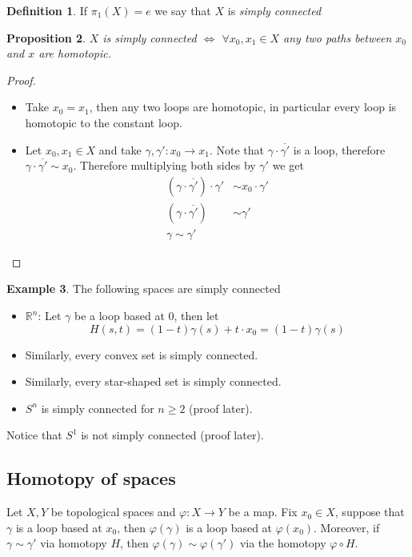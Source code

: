 \documentclass[11pt,a4paper]{article}
\theoremstyle{definition}
\newtheorem{definition}{Definition}[section]
\newtheorem{example}[definition]{Example}
\theoremstyle{plain}
\newtheorem{proposition}[definition]{Proposition}
\theoremstyle{remark}
\newcommand{\R}{\mathbb{R}}
\newcommand{\1}{\mathbbm{1}}
\begin{document}
\begin{definition}
    If $\pi_1(X) = e$ we say that $X$ is \emph{simply connected}
\end{definition}

\begin{proposition}
    $X$ is simply connected $\iff$ $\forall x_0, x_1 \in X$ any two paths between $x_0$ and $x$ are homotopic.
\end{proposition}

\begin{proof}
    \begin{itemize}
        \item[$\impliedby$] Take $x_0 = x_1$, then any two loops are homotopic, in particular every loop is homotopic to the constant loop.
        \item[$\implies$] Let $x_0, x_1 \in X$ and take $\gamma, \gamma' \colon x_0 \to x_1$. Note that $\gamma \cdot \overline{\gamma'}$ is a loop, 
        therefore $\gamma \cdot \overline{\gamma'} \sim x_0$. Therefore multiplying both sides by $\gamma'$ we get 
        \begin{align*}
            (\gamma \cdot \overline{\gamma'}) \cdot \gamma' &\sim x_0 \cdot \gamma' \\
            (\gamma \cdot \overline{\gamma'}) &\sim \gamma'\\
            \gamma \sim \gamma'
        \end{align*}
    \end{itemize}
\end{proof}

\begin{example}
    The following spaces are simply connected 
    \begin{itemize}
        \item $\R^n$: Let $\gamma$ be a loop based at $0$, then let 
        $$H(s, t) = (1-t) \gamma(s) + t \cdot x_0 = (1-t) \gamma(s)$$
        \item Similarly, every convex set is simply connected. 
        \item Similarly, every star-shaped set is simply connected. 
        \item $S^n$ is simply connected for $n \geq 2$ (proof later).
    \end{itemize}
    Notice that $S^1$ is not simply connected (proof later).
\end{example}

\subsection{Homotopy of spaces}
Let $X, Y$ be topological spaces and $\varphi \colon X \to Y$ be a map. Fix $x_0 \in X$, suppose that 
$\gamma$ is a loop based at $x_0$, then $\varphi (\gamma)$ is a loop based at $\varphi(x_0)$. 
Moreover, if $\gamma \sim \gamma'$ via homotopy $H$, then $\varphi (\gamma) \sim \varphi(\gamma')$ via the homotopy
$\varphi \circ H$. 
\end{document}
